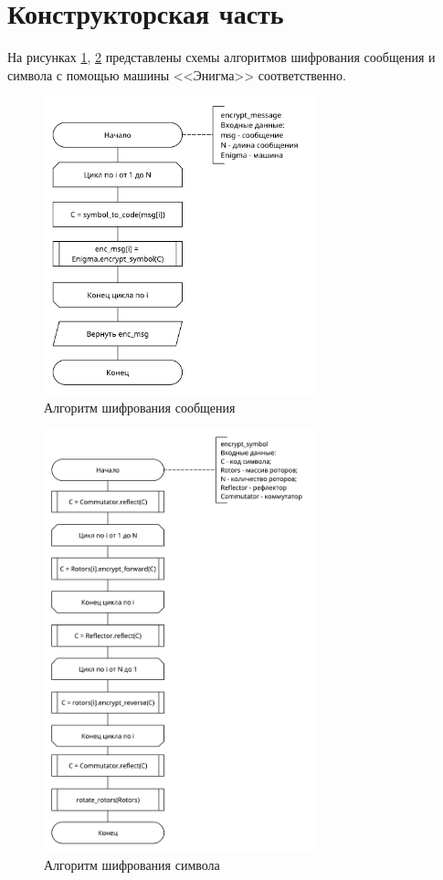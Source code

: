 \section{Конструкторская часть}

На рисунках \ref{img:encode_msg}, \ref{img:encode_symbol} представлены схемы алгоритмов шифрования сообщения и символа с помощью машины <<Энигма>> соответственно.

\begin{figure}[!htb]\centering
	\includegraphics[width=0.7\textwidth]{../img/encode_msg.pdf}
	\caption{Алгоритм шифрования сообщения}
	\label{img:encode_msg}
\end{figure}

\begin{figure}[!htb]\centering
	\includegraphics[width=0.7\textwidth]{../img/encode_symbol.pdf}
	\caption{Алгоритм шифрования символа}
	\label{img:encode_symbol}
\end{figure}